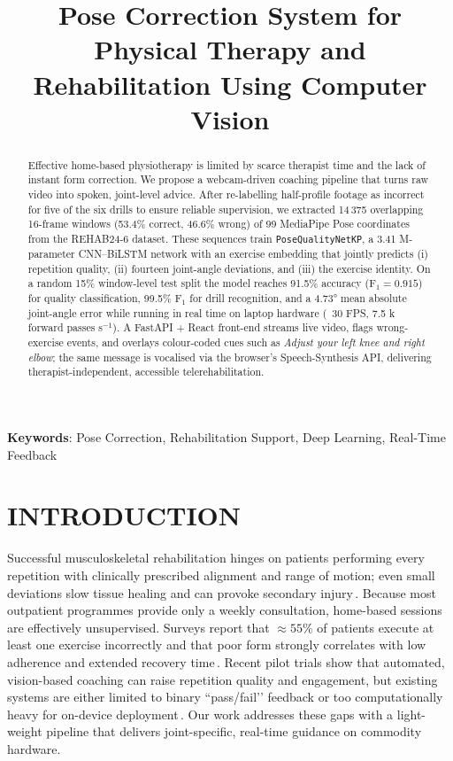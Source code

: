 \documentclass{article}
\title{Pose Correction System for Physical Therapy and Rehabilitation Using Computer Vision}
\begin{document}
\maketitle

\begin{abstract}

Effective home-based physiotherapy is limited by scarce therapist time and the lack of instant form correction. We propose a webcam-driven coaching pipeline that turns raw video into spoken, joint-level advice.  
After re-labelling half-profile footage as incorrect for five of the six drills to ensure reliable supervision, we extracted 14\,375 overlapping 16-frame windows (53.4\% correct, 46.6\% wrong) of 99 MediaPipe Pose coordinates from the REHAB24-6 dataset.  These sequences train \texttt{PoseQualityNetKP}, a 3.41 M-parameter CNN–BiLSTM network with an exercise embedding that jointly predicts (i) repetition quality, (ii) fourteen joint-angle deviations, and (iii) the exercise identity.  On a random 15\% window-level test split the model reaches 91.5\% accuracy (F\(_1=0.915\)) for quality classification, 99.5\% F\(_1\) for drill recognition, and a 4.73° mean absolute joint-angle error while running in real time on laptop hardware (~30 FPS, 7.5 k forward passes s\(^{-1}\)).  A FastAPI + React front-end streams live video, flags wrong-exercise events, and overlays colour-coded cues such as \emph{Adjust your left knee and right elbow}; the same message is vocalised via the browser’s Speech-Synthesis API, delivering therapist-independent, accessible telerehabilitation.

\end{abstract}
%

\textbf{Keywords}: Pose Correction, Rehabilitation Support, Deep Learning, Real-Time Feedback

\section{INTRODUCTION}
\label{sec:intro}

Successful musculoskeletal rehabilitation hinges on patients performing every repetition with clinically prescribed alignment and range of motion; even small deviations slow tissue healing and can provoke secondary injury\,\cite{Widhalm2024}.  Because most outpatient programmes provide only a weekly consultation, home-based sessions are effectively unsupervised.  Surveys report that \(\approx 55\%\) of patients execute at least one exercise incorrectly and that poor form strongly correlates with low adherence and extended recovery time\,\cite{faber2015homeexercise, Xing2025}.  Recent pilot trials show that automated, vision-based coaching can raise repetition quality and engagement, but existing systems are either limited to binary “pass/fail’’ feedback or too computationally heavy for on-device deployment\,\cite{Abedi2024}.  Our work addresses these gaps with a light-weight pipeline that delivers joint-specific, real-time guidance on commodity hardware.
\end{document}
